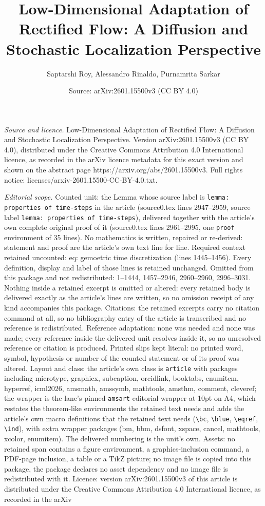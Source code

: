 \documentclass[10pt,a4paper]{amsart}
\title[Low-Dimensional Adaptation of Rectified Flow: A Diffusion an]{Low-Dimensional Adaptation of Rectified Flow: A Diffusion and Stochastic Localization Perspective}
\author{Saptarshi Roy, Alessandro Rinaldo, Purnamrita Sarkar}
\date{Source: arXiv:2601.15500v3 (CC BY 4.0)}
\begin{document}
\maketitle

\noindent\emph{Source and licence.} Low-Dimensional Adaptation of Rectified Flow: A Diffusion and Stochastic Localization Perspective. Version arXiv:2601.15500v3 (CC BY 4.0), distributed under the Creative Commons Attribution 4.0 International licence, as recorded in the arXiv licence metadata for this exact version and shown on the abstract page https://arxiv.org/abs/2601.15500v3. Full rights notice: licenses/arxiv-2601.15500-CC-BY-4.0.txt.\par\smallskip

\noindent\textit{Editorial scope.} Counted unit: the Lemma whose source label is \texttt{lemma: properties of time-steps} in the article (source0.tex lines 2947--2959, source label \texttt{lemma: properties of time-steps}), delivered together with the article's own complete original proof of it (source0.tex lines 2961--2995, one \texttt{proof} environment of 35 lines). No mathematics is written, repaired or re-derived: statement and proof are the article's own text line for line. Required context retained uncounted: eq: gemoetric time discretization (lines 1445--1456). Every definition, display and label of those lines is retained unchanged. Omitted from this package and not redistributed: 1--1444, 1457--2946, 2960--2960, 2996--3031. Nothing inside a retained excerpt is omitted or altered: every retained body is delivered exactly as the article's lines are written, so no omission receipt of any kind accompanies this package. Citations: the retained excerpts carry no citation command at all, so no bibliography entry of the article is transcribed and no reference is redistributed. Reference adaptation: none was needed and none was made; every reference inside the delivered unit resolves inside it, so no unresolved reference or citation is produced. Printed slips kept literal: no printed word, symbol, hypothesis or number of the counted statement or of its proof was altered. Layout and class: the article's own class is \texttt{article} with packages including microtype, graphicx, subcaption, orcidlink, booktabs, enumitem, hyperref, icml2026, amsmath, amssymb, mathtools, amsthm, comment, cleveref; the wrapper is the lane's pinned \texttt{amsart} editorial wrapper at 10pt on A4, which restates the theorem-like environments the retained text needs and adds the article's own macro definitions that the retained text needs (\texttt{\textbackslash bc}, \texttt{\textbackslash blue}, \texttt{\textbackslash eqref}, \texttt{\textbackslash ind}), with extra wrapper packages (bm, bbm, dsfont, xspace, cancel, mathtools, xcolor, enumitem). The delivered numbering is the unit's own. Assets: no retained span contains a figure environment, a graphics-inclusion command, a PDF-page inclusion, a table or a TikZ picture; no image file is copied into this package, the package declares no asset dependency and no image file is redistributed with it. Licence: version arXiv:2601.15500v3 of this article is distributed under the Creative Commons Attribution 4.0 International licence, as recorded in the arXiv 
\end{document}
